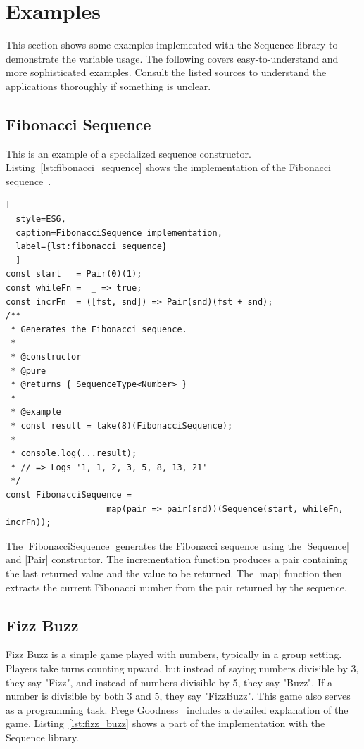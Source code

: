 \section{Examples} %
\label{sec:Examples}
This section shows some examples implemented with the
Sequence library to demonstrate the variable usage.
The following covers easy-to-understand and more sophisticated
examples. Consult the listed sources to understand the applications
thoroughly if something is unclear.

\subsection{Fibonacci Sequence}
\label{sub:Fibonacci Sequence}
This is an example of a specialized sequence constructor.
Listing~\ref{lst:fibonacci_sequence} shows the implementation of the Fibonacci 
sequence~\cite[p.~36]{math_diskrete_2011}. 
\begin{lstlisting}[
  style=ES6, 
  caption=FibonacciSequence implementation,
  label={lst:fibonacci_sequence}
  ]
const start   = Pair(0)(1);
const whileFn =  _ => true;
const incrFn  = ([fst, snd]) => Pair(snd)(fst + snd);
/**
 * Generates the Fibonacci sequence.
 *
 * @constructor
 * @pure
 * @returns { SequenceType<Number> }
 *
 * @example
 * const result = take(8)(FibonacciSequence);
 *
 * console.log(...result);
 * // => Logs '1, 1, 2, 3, 5, 8, 13, 21'
 */
const FibonacciSequence = 
                    map(pair => pair(snd))(Sequence(start, whileFn, incrFn));
\end{lstlisting}
The |FibonacciSequence| generates the Fibonacci sequence using the |Sequence|
and |Pair| constructor. The incrementation function produces a pair containing
the last returned value and the value to be returned.  The |map| function then
extracts the current Fibonacci number from the pair returned by the sequence.

\subsection{Fizz Buzz}
\label{sub:Fizz Buzz}
Fizz Buzz is a simple game played with numbers, typically in a group setting. Players
take turns counting upward, but instead of saying numbers divisible by 3, they
say "Fizz", and instead of numbers divisible by 5, they say "Buzz". If a number
is divisible by both 3 and 5, they say "FizzBuzz". This game also serves as a 
programming task.
\newline
Frege Goodness~\cite{frege_goodness} includes a detailed explanation of the
game. Listing~\ref{lst:fizz_buzz} shows a part of the implementation with the
Sequence library.

